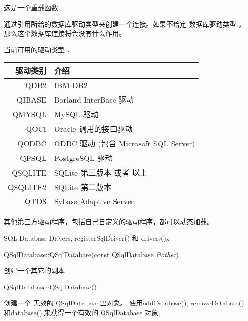 这是一个重载函数

通过引用所给的数据库驱动类型来创建一个连接。如果不给定 数据库驱动类型 ，那么这个数据库连接将会没有什么作用。

当前可用的驱动类型：

\begin{tabular}{|r|l|}
	\hline	
	驱动类别& 介绍\\
	\hline
	QDB2&	IBM DB2\\
		\hline
	QIBASE	&Borland InterBase 驱动\\
		\hline
	QMYSQL	&MySQL 驱动\\
		\hline
	QOCI	&Oracle 调用的接口驱动\\
		\hline
	QODBC	&ODBC 驱动 (包含 Microsoft SQL Server)\\
		\hline
	QPSQL	&PostgreSQL 驱动\\
		\hline
	QSQLITE	&SQLite 第三版本 或者 以上\\
		\hline
	QSQLITE2&	SQLite 第二版本\\
		\hline
	QTDS	&Sybase Adaptive Server\\
	\hline
\end{tabular}

其他第三方驱动程序，包括自己自定义的驱动程序，都可以动态加载。

\begin{seeAlso}
\href{https://doc.qt.io/qt-5/sql-driver.html}{SQL Database Drivers}, \href{https://github.com/QtDocumentCN/QtDocumentCN/blob/master/Src/S/QSqlDatabase/QSqlDatabase.md#static-void-qsqldatabaseregistersqldriverconst-qstring-name-qsqldrivercreatorbase-creator}{registerSqlDriver()} 和 \href{https://github.com/QtDocumentCN/QtDocumentCN/blob/master/Src/S/QSqlDatabase/QSqlDatabase.md#static-qstringlist-qsqldatabasedrivers}{drivers()}。
\end{seeAlso}


QSqlDatabase::QSqlDatabase(const QSqlDatabase \emph{\&other})

创建一个其它的副本

QSqlDatabase::QSqlDatabase()

创建一个 无效的 QSqlDatabase 空对象。
使用\href{https://github.com/QtDocumentCN/QtDocumentCN/blob/master/Src/S/QSqlDatabase/QSqlDatabase.md#static-qsqldatabase-qsqldatabaseadddatabaseconst-qstring-type-const-qstring-connectionname--qlatin1stringdefaultconnection}{addDatabase()},  \href{https://github.com/QtDocumentCN/QtDocumentCN/blob/master/Src/S/QSqlDatabase/QSqlDatabase.md#static-void-qsqldatabaseremovedatabaseconst-qstring-connectionname}{removeDatabase()} 和\href{https://github.com/QtDocumentCN/QtDocumentCN/blob/master/Src/S/QSqlDatabase/QSqlDatabase.md#static-qsqldatabase-qsqldatabasedatabaseconst-qstring-connectionname--qlatin1stringdefaultconnection-bool-open--true}{database()} 来获得一个有效的 QSqlDatabase 对象。

